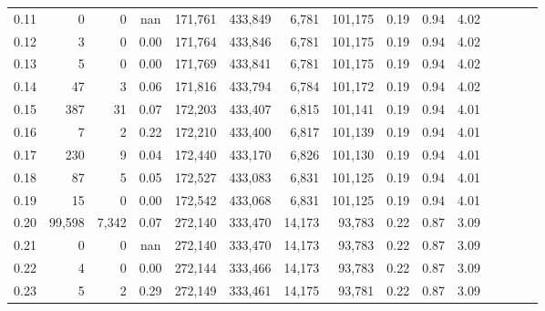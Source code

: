 \begin{tabular}{rrrcrrrrrrrrrrr}
0.11 &       0 &       0 &                                        nan &  171,761 &  433,849 &    6,781 &  101,175 &  0.19 &  0.94 &                         4.02 \\
0.12 &       3 &       0 &                                       0.00 &  171,764 &  433,846 &    6,781 &  101,175 &  0.19 &  0.94 &                         4.02 \\
0.13 &       5 &       0 &                                       0.00 &  171,769 &  433,841 &    6,781 &  101,175 &  0.19 &  0.94 &                         4.02 \\
0.14 &      47 &       3 &                                       0.06 &  171,816 &  433,794 &    6,784 &  101,172 &  0.19 &  0.94 &                         4.02 \\
0.15 &     387 &      31 &                                       0.07 &  172,203 &  433,407 &    6,815 &  101,141 &  0.19 &  0.94 &                         4.01 \\
0.16 &       7 &       2 &                                       0.22 &  172,210 &  433,400 &    6,817 &  101,139 &  0.19 &  0.94 &                         4.01 \\
0.17 &     230 &       9 &                                       0.04 &  172,440 &  433,170 &    6,826 &  101,130 &  0.19 &  0.94 &                         4.01 \\
0.18 &      87 &       5 &                                       0.05 &  172,527 &  433,083 &    6,831 &  101,125 &  0.19 &  0.94 &                         4.01 \\
0.19 &      15 &       0 &                                       0.00 &  172,542 &  433,068 &    6,831 &  101,125 &  0.19 &  0.94 &                         4.01 \\
0.20 &  99,598 &   7,342 &                                       0.07 &  272,140 &  333,470 &   14,173 &   93,783 &  0.22 &  0.87 &                         3.09 \\
0.21 &       0 &       0 &                                        nan &  272,140 &  333,470 &   14,173 &   93,783 &  0.22 &  0.87 &                         3.09 \\
0.22 &       4 &       0 &                                       0.00 &  272,144 &  333,466 &   14,173 &   93,783 &  0.22 &  0.87 &                         3.09 \\
0.23 &       5 &       2 &                                       0.29 &  272,149 &  333,461 &   14,175 &   93,781 &  0.22 &  0.87 &                         3.09 \\

\end{tabular}
